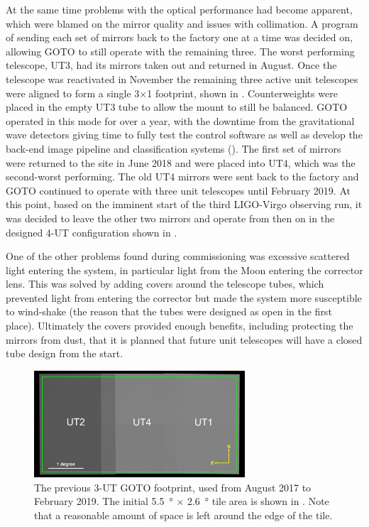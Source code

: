 \begin{colsection}
\begin{colsection}
At the same time problems with the optical performance had become apparent, which were blamed on the mirror quality and issues with collimation. A program of sending each set of mirrors back to the factory one at a time was decided on, allowing GOTO to still operate with the remaining three. The worst performing telescope, UT3, had its mirrors taken out and returned in August. Once the telescope was reactivated in November the remaining three active unit telescopes were aligned to form a single 3$\times$1 footprint, shown in . Counterweights were placed in the empty UT3 tube to allow the mount to still be balanced. GOTO operated in this mode for over a year, with the downtime from the gravitational wave detectors giving time to fully test the control software as well as develop the back-end image pipeline and classification systems (). The first set of mirrors were returned to the site in June 2018 and were placed into UT4, which was the second-worst performing. The old UT4 mirrors were sent back to the factory and GOTO continued to operate with three unit telescopes until February 2019. At this point, based on the imminent start of the third LIGO-Virgo observing run, it was decided to leave the other two mirrors and operate from then on in the designed 4-UT configuration shown in .

One of the other problems found during commissioning was excessive scattered light entering the system, in particular light from the Moon entering the corrector lens. This was solved by adding covers around the telescope tubes, which prevented light from entering the corrector but made the system more susceptible to wind-shake (the reason that the tubes were designed as open in the first place). Ultimately the covers provided enough benefits, including protecting the mirrors from dust, that it is planned that future unit telescopes will have a closed tube design from the start.

\newpage

\begin{figure}[p]
    \begin{center}
        \includegraphics[width=0.7\textwidth]{images/footprint_1_box.png}
    \end{center}
    \caption[The previous 3-UT GOTO footprint]{
        The previous 3-UT GOTO footprint, used from August 2017 to February 2019. The initial \SI{5.5}{\degree} $\times$ \SI{2.6}{\degree} tile area is shown in . Note that a reasonable amount of space is left around the edge of the tile.
    }\label{fig:3ut_footprint}
\end{figure}


\end{colsection}
\end{colsection}

